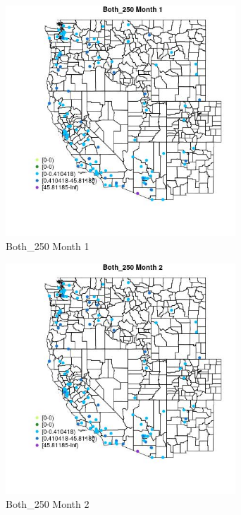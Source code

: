 \begin{figure} 
\centering  
\includegraphics[width=0.77\textwidth]{Code_Outputs/Report_ML_input_PM25_Step4_part_e_de_duplicated_aves_MapObsMo1Both_250.jpg} 
\caption{\label{fig:Report_ML_input_PM25_Step4_part_e_de_duplicated_avesMapObsMo1Both_250}Both_250 Month 1} 
\end{figure} 
 

\begin{figure} 
\centering  
\includegraphics[width=0.77\textwidth]{Code_Outputs/Report_ML_input_PM25_Step4_part_e_de_duplicated_aves_MapObsMo2Both_250.jpg} 
\caption{\label{fig:Report_ML_input_PM25_Step4_part_e_de_duplicated_avesMapObsMo2Both_250}Both_250 Month 2} 
\end{figure} 
 

